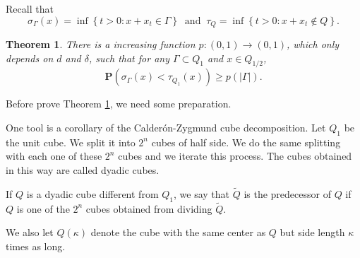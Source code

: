 \documentclass[twoside, 12pt]{book}
\numberwithin{equation}{chapter}
\newtheorem{theorem}{Theorem}[section]
\def\bP{{\mathbf P}}
\def\l{\left}
\def\r{\right}
\def\geq{\geqslant}
\begin{document}
	Recall that 
	\[
	    \sigma_{\Gamma}(x)= \inf\l\{t>0: x+x_t\in \Gamma\r\} ~\mbox{ and }~ \tau_Q= \inf\l\{t>0: x+x_t\notin Q\r\}. 
	\]
	\begin{theorem}\label{thm:hit}
		There is a increasing function $p: (0,1)\to (0,1)$, which only depends on $d$ and $\delta$, such that for any $\Gamma \subset Q_1$ and $x\in Q_{1/2}$,  
		\begin{equation}
			\bP (\sigma_\Gamma(x)<\tau_{Q_1}(x)) \geq p(|\Gamma|). 
		\end{equation}
	\end{theorem}
	
	Before prove Theorem \ref{thm:hit}, we need some preparation.  
	
	One tool is a corollary of the Calderón-Zygmund cube decomposition. Let $Q_1$ be the unit cube. We split it into $2^n$ cubes of half side. We do the same splitting with each one of these $2^n$ cubes and we iterate this process. The cubes obtained in this way are called dyadic cubes. 
	
	If $Q$ is a dyadic cube different from $Q_1$, we say that $\widetilde{Q}$ is the predecessor of $Q$ if $Q$ is one of the $2^n$ cubes obtained from dividing $\widetilde{Q}$.
	
	We also let $Q(\kappa)$ denote the cube with the same center as $Q$ but side length $\kappa$ times as long.
	
\end{document}
